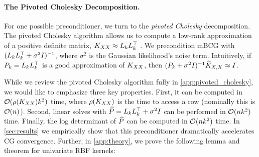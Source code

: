 \paragraph{The Pivoted Cholesky Decomposition.}
For one possible preconditioner, we turn to the \emph{pivoted Cholesky} decomposition.
The pivoted Cholesky algorithm allows us to compute a low-rank approximation of a positive definite matrix, $K_{XX} \approx L_{k} L_{k}^{\top}$ \cite{harbrecht2012low}.
We precondition mBCG with $(L_k L_k^\top + \sigma^2 I)^{-1}$, where $\sigma^2$ is the Gaussian likelihood's noise term.
Intuitively, if $P_{k}=L_{k}L_{k}^{\top}$ is a good approximation of $K_{XX}$, then $(P_{k} + \sigma^{2}I)^{-1}\widehat{K}_{X,X} \approx I$.

While we review the pivoted Cholesky algorithm fully in \autoref{app:pivoted_cholesky}, we would like to emphasize three key properties. First, it can be computed in $\bigo{\row{\bK_{\bX\bX}}k^{2}}$ time, where $\rho ( K_{XX} )$ is the time to access a row (nominally this is $\bigo{n}$).
Second, linear solves with $\widehat{P} = L_{k}L_{k}^{\top} + \sigma^{2}I$ can be performed in $\bigo{nk^{2}}$ time. Finally, the log determinant of $\widehat{P}$ can be computed in $\bigo{nk^{2}}$ time.
In \autoref{sec:results} we empirically show that this preconditioner dramatically accelerates CG convergence.
Further, in \autoref{app:theory}, we prove the following lemma and theorem for univariate RBF kernels:

